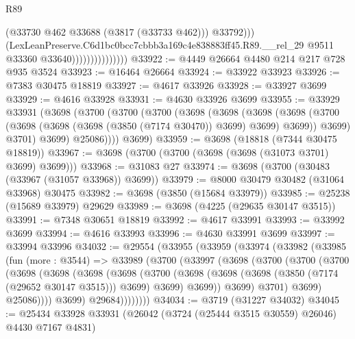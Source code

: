 \begin{lexlean}{R89}
\begin{coremodule}
                                      (@33730 @462 @33688 (@3817 (@33733 @462)))
                                      @33792)))
                                (LexLeanPreserve.C6d1bc0bcc7cbbb3a169c4e838883ff45.R89.__rel_29
                                  @9511
                                  @33360
                                  @33640)))))))))))))))
@33922 := @4449 @26664 @4480 @214 @217 @728 @935 @3524
@33923 := @16464 @26664
@33924 := @33922 @33923
@33926 := @7383 @30475 @18819
@33927 := @4617 @33926
@33928 := @33927 @3699
@33929 := @4616 @33928
@33931 := @4630 @33926 @3699
@33955 := @33929
    @33931
    (@3698
      (@3700
        (@3700
          (@3700
            (@3698
              (@3698
                (@3698
                  (@3698
                    (@3700 (@3698 (@3698 (@3698 (@3850 (@7174 @30470)) @3699) @3699) @3699))
                    @3699)
                  @3701)
                @3699)
              @25086))))
      @3699)
@33959 := @3698 (@18818 (@7344 @30475 @18819))
@33967 := @3698 (@3700 (@3700 (@3698 (@3698 (@31073 @3701) @3699) @3699)))
@33968 := @31083 @27
@33974 := @3698 (@3700 (@30483 (@33967 (@31057 @33968)) @3699))
@33979 := @8000 @30479 @30482 (@31064 @33968) @30475
@33982 := @3698 (@3850 (@15684 @33979))
@33985 := @25238 (@15689 @33979) @29629
@33989 := @3698 (@4225 (@29635 @30147 @3515))
@33991 := @7348 @30651 @18819
@33992 := @4617 @33991
@33993 := @33992 @3699
@33994 := @4616 @33993
@33996 := @4630 @33991 @3699
@33997 := @33994 @33996
@34032 := @29554
    (@33955
      (@33959
        (@33974
          (@33982
            (@33985
              (fun (more : @3544) =>
              @33989
                (@3700
                  (@33997
                    (@3698
                      (@3700
                        (@3700
                          (@3700
                            (@3698
                              (@3698
                                (@3698
                                  (@3698
                                    (@3700
                                      (@3698
                                        (@3698
                                          (@3698 (@3850 (@7174 (@29652 @30147 @3515))) @3699)
                                          @3699)
                                        @3699))
                                    @3699)
                                  @3701)
                                @3699)
                              @25086))))
                      @3699)
                    @29684))))))))
@34034 := @3719 (@31227 @34032)
@34045 := @25434 @33928 @33931 (@26042 (@3724 (@25444 @3515 @30559) @26046) @4430 @7167 @4831)

\end{coremodule}
\end{lexlean}

